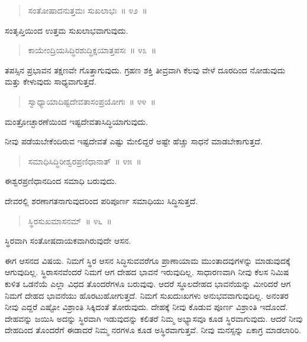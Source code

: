 \vspace{-0.3cm}

\begin{verse}
ಸಂತೋಷಾದನುತ್ತಮಃ ಸುಖಲಾಭಃ~॥ ೪೨~॥
\end{verse}

\vspace{-0.3cm}

ಸಂತೃಪ್ತಿಯಿಂದ ಉತ್ತಮ ಸುಖಲಾಭವಾಗುವುದು. 

\vspace{-0.3cm}

\begin{verse}
ಕಾಯೇಂದ್ರಿಯಸಿದ್ಧಿರಶುದ್ಧಿಕ್ಷಯಾತ್ತಪಸಃ~॥ ೪೩~॥
\end{verse}

\vspace{-0.3cm}

ತಪಸ್ಸಿನ ಪ್ರಭಾವನ ತಕ್ಷಣವೇ ಗೊತ್ತಾಗುವುದು. ಗ್ರಹಣ ಶಕ್ತಿ ತೀವ್ರವಾಗಿ ಕೆಲವು ವೇಳೆ ದೂರದಿಂದ ನೋಡುವುದು ಮತ್ತು ಕೇಳುವುದು ಸಾಧ್ಯವಾಗುತ್ತದೆ. 

\vspace{-0.3cm}

\begin{verse}
ಸ್ವಾಧ್ಯಾಯಾದಿಷ್ಟದೇವತಾಸಂಪ್ರಯೋಗಃ~॥ ೪೪~॥
\end{verse}

\vspace{-0.3cm}

ಮಂತ್ರೋಚ್ಛಾರಣೆಯಿಂದ ಇಷ್ಟದೇವತಾಸಿದ್ಧಿಯಾಗುವುದು. 

ನೀವು ಪಡೆಯಬೇಕೆಂದಿರುವ ಇಷ್ಟದೇವತೆ ಎಷ್ಟು ಮೇಲಿದ್ದರೆ ಅಷ್ಟೇ ಹೆಚ್ಚು ಸಾಧನೆ ಮಾಡಬೇಕಾಗುತ್ತದೆ. 

\vspace{-0.3cm}

\begin{verse}
ಸಮಾಧಿಸಿದ್ಧಿರೀಶ್ವರಪ್ರಣಿಧಾನಾತ್​~॥ ೪೫~॥
\end{verse}

\vspace{-0.3cm}

ಈಶ್ವರಪ್ರಣಿಧಾನದಿಂದ ಸಮಾಧಿ ಬರುವುದು. 

ದೇವರಲ್ಲಿ ಶರಣಾಗತನಾಗುವುದರಿಂದ ಪರಿಪೂರ್ಣ ಸಮಾಧಿಯು ಸಿದ್ಧಿಸುತ್ತದೆ. 

\vspace{-0.3cm}

\begin{verse}
ಸ್ಥಿರಸುಖಮಾಸನಮ್​~॥ ೪೬~॥
\end{verse}

\vspace{-0.3cm}

ಸ್ಥಿರವಾಗಿ ಸಂತೋಷದಾಯಕವಾಗಿರುವುದೇ ಆಸನ. 

ಈಗ ಆಸನದ ವಿಷಯ. ನಿಮಗೆ ಸ್ಥಿರ ಆಸನ ಸಿದ್ಧಿಸುವವರೆಗೂ ಪ್ರಾಣಾಯಾಮ ಮುಂತಾದವುಗಳನ್ನು ಮಾಡುವುದಕ್ಕೆ ಆಗುವುದಿಲ್ಲ. ಸ್ಥಿರಾಸನವೆಂದರೆ ನಿಮಗೆ ಆಗ ದೇಹದ ಭಾವನೆ ಇರುವುದಿಲ್ಲ. ಸಾಧಾರಣವಾಗಿ ನೀವು ಕೆಲಸ ನಿಮಿಷ ಕುಳಿತ ಒಡನೆಯೆ ಎಲ್ಲಾ ವಿಧದ ತೊಂದರೆಗಳೂ ಬರುವುವು. ಆದರೆ ಸ್ಥೂಲದೇಹದ ಭಾವನೆಯನ್ನು ಮೀರಿದರೆ ಆಗ ನಿಮಗೆ ದೇಹದ ಭಾವನೆಯು ಹೊರಟುಹೋಗುತ್ತದೆ. ನಿಮಗೆ ಸುಖದುಃಖಗಳು ಅನುಭವವಾಗುವುದಿಲ್ಲ. ಅನಂತರ ನೀವು ಎದ್ದರೆ ಎಷ್ಟೋ ವಿಶ್ರಾಂತಿ ಸಿಕ್ಕಿದಂತೆ ತೋರುವುದು. ದೇಹಕ್ಕೆ ನೀವು ಕೊಡುವ ಪೂರ್ಣ ವಿಶ್ರಾಂತಿ ಇದೊಂದೆ. ದೇಹವನ್ನು ಜಯಿಸಿ ಅದನ್ನು ಸ್ಥಿರವಾಗಿ ಇಡುವುದನ್ನು ಕಲಿತರೆ ನಿಮ್ಮ ಅಭ್ಯಾಸವೂ ಕೂಡ ಸ್ಥಿರವಾಗುವುದು. ಆದರೆ ನೀವು ದೇಹದಿಂದ ತೊಂದರೆಗೆ ಈಡಾದರೆ ನಿಮ್ಮ ನರಗಳೂ ಕೂಡ ಅಸ್ಥಿರವಾಗುತ್ತವೆ. ನೀವು ಮನಸ್ಸನ್ನು ಏಕಾಗ್ರ ಮಾಡಲಾರಿರಿ. 

